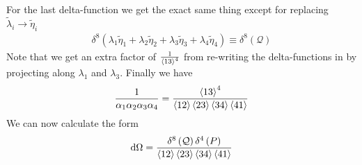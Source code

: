 \documentclass[letter,11pt]{article}
\begin{document}
For the last delta-function we get the exact same thing except for replacing $\tilde \lambda_i\to \tilde \eta_i$
\begin{equation}
	\begin{aligned}
		\delta^{8}(\lambda_1\tilde\eta_1+\lambda_2\tilde\eta_2+\lambda_3\tilde\eta_3+\lambda_4\tilde\eta_4)\equiv \delta^{8}\left(\mathcal{Q}\right)
	\end{aligned}
\end{equation}
Note that we get an extra factor of $\frac{1}{\expval{13}^4}$ from re-writing the delta-functions in by projecting along $\lambda_1$ and $\lambda_3$.
 Finally we have
\begin{equation}
	\begin{aligned}
		\frac{1}{\alpha_1 \alpha_2 \alpha_3 \alpha_4}=\frac{\expval{13}^4}{\expval{12}\expval{23}\expval{34}\expval{41}}
	\end{aligned}
\end{equation}
We can now calculate the form
\begin{equation}
	\begin{aligned}
		\dd \Omega =
		\frac{\delta^{8}\left(\mathcal{Q}\right)\delta^{4}\left(P\right)}{\expval{12}\expval{23}\expval{34}\expval{41}}
	\end{aligned}
\end{equation}
\end{document}
